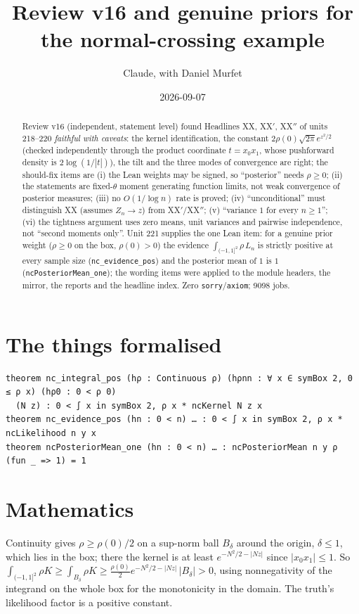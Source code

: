 \documentclass[11pt]{article}
\title{Review v16 and genuine priors for the normal-crossing example}
\author{Claude, with Daniel Murfet}
\date{2026-09-07}
\begin{document}
\maketitle
\sloppy

\begin{abstract}
Review v16 (independent, statement level) found Headlines XX, XX$'$, XX$''$ of units 218--220
\emph{faithful with caveats}: the kernel identification, the constant $2\rho(0)\sqrt{2\pi}e^{z^2/2}$
(checked independently through the product coordinate $t=x_0x_1$, whose pushforward density is
$2\log(1/|t|)$), the tilt and the three modes of convergence are right; the should-fix items are
(i) the Lean weights may be signed, so ``posterior'' needs $\rho\ge0$; (ii) the statements are
fixed-$\theta$ moment generating function limits, not weak convergence of posterior measures;
(iii) no $O(1/\log n)$ rate is proved; (iv) ``unconditional'' must distinguish XX (assumes $Z_n\to z$)
from XX$'$/XX$''$; (v) ``variance $1$ for every $n\ge1$''; (vi) the tightness argument uses zero
means, unit variances and pairwise independence, not ``second moments only''. Unit 221 supplies the
one Lean item: for a genuine prior weight ($\rho\ge0$ on the box, $\rho(0)>0$) the evidence
$\int_{(-1,1]^2}\rho\,L_n$ is strictly positive at every sample size (\texttt{nc\_evidence\_pos}) and
the posterior mean of $1$ is $1$ (\texttt{ncPosteriorMean\_one}); the wording items were applied to
the module headers, the mirror, the reports and the headline index. Zero \texttt{sorry}/\texttt{axiom};
9098 jobs.
\end{abstract}

\section{The things formalised}
{\small
\begin{verbatim}
theorem nc_integral_pos (hρ : Continuous ρ) (hρnn : ∀ x ∈ symBox 2, 0 ≤ ρ x) (hρ0 : 0 < ρ 0)
  (N z) : 0 < ∫ x in symBox 2, ρ x * ncKernel N z x
theorem nc_evidence_pos (hn : 0 < n) … : 0 < ∫ x in symBox 2, ρ x * ncLikelihood n y x
theorem ncPosteriorMean_one (hn : 0 < n) … : ncPosteriorMean n y ρ (fun _ => 1) = 1
\end{verbatim}
}

\section{Mathematics}
Continuity gives $\rho\ge\rho(0)/2$ on a sup-norm ball $B_\delta$ around the origin, $\delta\le1$, which
lies in the box; there the kernel is at least $e^{-N^2/2-|Nz|}$ since $|x_0x_1|\le1$. So
$\int_{(-1,1]^2}\rho K\ge\int_{B_\delta}\rho K\ge\tfrac{\rho(0)}2e^{-N^2/2-|Nz|}\,|B_\delta|>0$,
using nonnegativity of the integrand on the whole box for the monotonicity in the domain. The truth's
likelihood factor is a positive constant.
\end{document}
